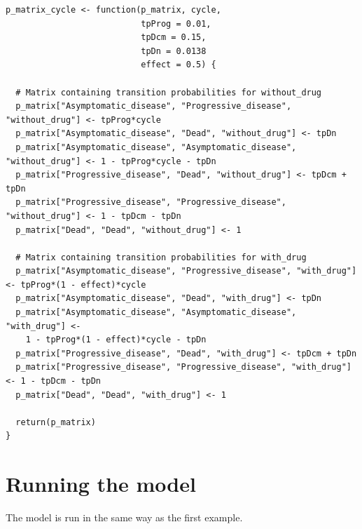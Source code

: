 \documentclass[a4paper,twoside,openany]{../svmonoBUGS}\usepackage[]{graphicx}\usepackage[]{color}
\begin{document}
\begin{verbatim}
p_matrix_cycle <- function(p_matrix, cycle,
                           tpProg = 0.01,
                           tpDcm = 0.15,
                           tpDn = 0.0138
                           effect = 0.5) {
  
  # Matrix containing transition probabilities for without_drug
  p_matrix["Asymptomatic_disease", "Progressive_disease", "without_drug"] <- tpProg*cycle
  p_matrix["Asymptomatic_disease", "Dead", "without_drug"] <- tpDn
  p_matrix["Asymptomatic_disease", "Asymptomatic_disease", "without_drug"] <- 1 - tpProg*cycle - tpDn
  p_matrix["Progressive_disease", "Dead", "without_drug"] <- tpDcm + tpDn
  p_matrix["Progressive_disease", "Progressive_disease", "without_drug"] <- 1 - tpDcm - tpDn
  p_matrix["Dead", "Dead", "without_drug"] <- 1
  
  # Matrix containing transition probabilities for with_drug
  p_matrix["Asymptomatic_disease", "Progressive_disease", "with_drug"] <- tpProg*(1 - effect)*cycle
  p_matrix["Asymptomatic_disease", "Dead", "with_drug"] <- tpDn
  p_matrix["Asymptomatic_disease", "Asymptomatic_disease", "with_drug"] <-
    1 - tpProg*(1 - effect)*cycle - tpDn
  p_matrix["Progressive_disease", "Dead", "with_drug"] <- tpDcm + tpDn
  p_matrix["Progressive_disease", "Progressive_disease", "with_drug"] <- 1 - tpDcm - tpDn
  p_matrix["Dead", "Dead", "with_drug"] <- 1

  return(p_matrix)
}
\end{verbatim}


\section{Running the model}
The model is run in the same way as the first example.
\end{document}
